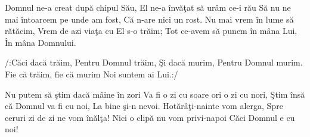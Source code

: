 
\beginverse
Domnul ne-a creat după chipul Său,
El ne-a învăţat să urâm ce-i rău
Să nu ne mai întoarcem pe unde am fost,
Că n-are nici un rost.
Nu mai vrem în lume să rătăcim,
Vrem de azi viaţa cu El s-o trăim;
Tot ce-avem să punem în mâna Lui,
În mâna Domnului.
\endverse

\beginchorus
/:Căci dacă trăim,
Pentru Domnul trăim,
Şi dacă murim,
Pentru Domnul murim.
Fie că trăim, fie că murim
Noi suntem ai Lui.:/
\endchorus

\beginverse
Nu putem să ştim dacă mâine în zori
Va fi o zi cu soare ori o zi cu nori,
Ştim însă că Domnul va fi cu noi,
La bine şi-n nevoi.
Hotărâţi-nainte vom alerga,
Spre ceruri zi de zi ne vom înălţa!
Nici o clipă nu vom privi-napoi
Căci Domnul e cu noi! 
\endverse

\endsong

